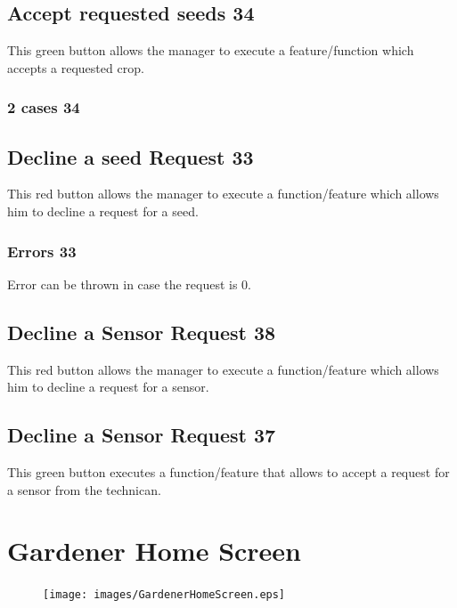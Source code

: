 \subsection{Accept requested seeds 34}
This green button allows the manager to execute a feature/function which accepts
a requested crop. 
\subsubsection{2 cases 34}


\subsection{Decline a seed Request 33}
This red button allows the manager to execute a function/feature which allows
him to decline a request for a seed.

\subsubsection{Errors 33}
Error can be thrown in case the request is 0.


\subsection{Decline a Sensor Request 38}
This red button allows the manager to execute a function/feature which allows
him to decline a request for a sensor.
\subsection{Decline a Sensor Request 37}
This green button executes a function/feature that allows to accept a request
for a sensor from the technican.





\section{Gardener Home Screen}
\label{sec:appendix_Gardener_Home_Screen}

\begin{figure}[H]
\texttt{[image: images/GardenerHomeScreen.eps]}
\end{figure}

